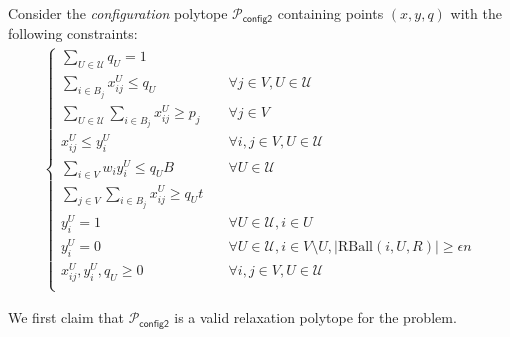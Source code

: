 \documentclass[a4paper,11pt]{article}
\newcommand{\U}{\mathcal{U}}
\renewcommand{\P}{\mathcal{P}}
\newcommand{\RBall}{\mathrm{RBall}}
\begin{document}
Consider the \emph{configuration} polytope $\P_\textsf{config2}$ containing points $(x,y,q)$ with the following constraints:
\begin{align*}
  \begin{cases}
      \sum_{U \in \U}q_U = 1     & \quad \\
      \sum_{i \in B_j} x^{U}_{ij} \leq q_U    & \quad \forall j \in V, U \in \U \\
      \sum_{U \in \U} \sum_{i \in B_j} x^{U}_{ij} \geq p_j    & \quad \forall j \in V \\
       x^{U}_{ij} \leq y^{U}_i   & \quad \forall i,j \in V, U \in \U\\
       \sum_{i \in V} w_i y^{U}_i \leq q_U B   & \quad  \forall U \in \U \\
       \sum_{j \in V} \sum_{i \in B_j} x^{U}_{ij} \geq q_U t   & \quad \\
       y^{U}_i = 1 & \quad \forall U \in \U, i \in U\\
       y^{U}_i = 0 & \quad \forall U \in \U, i \in V \setminus U, |\RBall(i, U, R)| \geq \epsilon n \\
       x^{U}_{ij}, y^{U}_i, q_U \geq 0   & \quad \forall i,j \in V, U \in \U \\
  \end{cases}
\end{align*}

We first claim that $\P_\textsf{config2}$ is a valid relaxation polytope for the problem.
\end{document}
